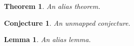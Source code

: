 \documentclass{article}
\newtheorem{thm}{Theorem}
\newtheorem{conj}{Conjecture}
\newtheorem{lem}{Lemma}
\begin{document}
\begin{thm}\label{t:alias}
An alias theorem.
\end{thm}

\begin{conj}\label{c:alias}
An unmapped conjecture.
\end{conj}

\begin{lem}\label{l:alias}
An alias lemma.
\end{lem}
\end{document}
